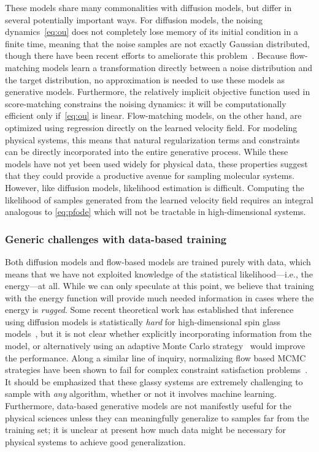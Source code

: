 \documentclass[11pt]{article}
\begin{document}
These models share many commonalities with diffusion models, but differ in several potentially important ways.
For diffusion models, the noising dynamics~\eqref{eq:ou} does not completely lose memory of its initial condition in a finite time, meaning that the noise samples are not exactly Gaussian distributed, though there have been recent efforts to ameliorate this problem~\cite{shi_diffusion_2023}.
Because flow-matching models learn a transformation directly between a noise distribution and the target distribution, no approximation is needed to use these models as generative models. 
Furthermore, the relatively implicit objective function used in score-matching constrains the noising dynamics: it will be computationally efficient only if~\eqref{eq:ou} is linear.
Flow-matching models, on the other hand, are optimized using regression directly on the learned velocity field. 
For modeling physical systems, this means that natural regularization terms and constraints can be directly incorporated into the entire generative process. 
While these models have not yet been used widely for physical data, these properties suggest that they could provide a productive avenue for sampling molecular systems. 
However, like diffusion models, likelihood estimation is difficult. 
Computing the likelihood of samples generated from the learned velocity field requires an integral analogous to \eqref{eq:pfode} which will not be tractable in high-dimensional systems.


\subsubsection{Generic challenges with data-based training}\label{sec:databased}

Both diffusion models and flow-based models are trained purely with data, which means that we have not exploited knowledge of the statistical likelihood---i.e., the energy---at all. 
While we can only speculate at this point, we believe that training with the energy function will provide much needed information in cases where the energy is \emph{rugged}.
Some recent theoretical work has established that inference using diffusion models is statistically \emph{hard} for high-dimensional spin glass models~\cite{ghio_sampling_2023}, but it is not clear whether explicitly incorporating information from the model, or alternatively using an adaptive Monte Carlo strategy~\cite{gabrie_efficient_2021, gabrie_adaptive_2022} would improve the performance.
Along a similar line of inquiry, normalizing flow based MCMC strategies have been shown to fail for complex constraint satisfaction problems~\cite{ciarella_machine-learning-assisted_2023}.
It should be emphasized that these glassy systems are extremely challenging to sample with \emph{any} algorithm, whether or not it involves machine learning.
Furthermore, data-based generative models are not manifestly useful for the physical sciences unless they can meaningfully generalize to samples far from the training set; it is unclear at present how much data might be necessary for physical systems to achieve good generalization.
\end{document}

